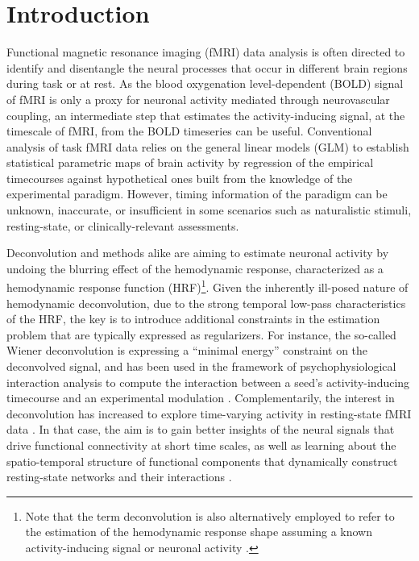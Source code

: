 
\section{Introduction}

Functional magnetic resonance imaging (fMRI) data analysis is often directed to
identify and disentangle the neural processes that occur in different brain
regions during task or at rest. As the blood oxygenation level-dependent (BOLD)
signal of fMRI is only a proxy for neuronal activity mediated through
neurovascular coupling, an intermediate step that estimates the
activity-inducing signal, at the timescale of fMRI, from the BOLD timeseries can
be useful. Conventional analysis of task fMRI data relies on the general linear
models (GLM) to establish statistical parametric maps of brain activity by
regression of the empirical timecourses against hypothetical ones built from the
knowledge of the experimental paradigm. However, timing information of the
paradigm can be unknown, inaccurate, or insufficient in some scenarios such as
naturalistic stimuli, resting-state, or clinically-relevant assessments.

Deconvolution and methods alike are aiming to estimate neuronal activity by
undoing the blurring effect of the hemodynamic response, characterized as a
hemodynamic response function (HRF)\footnote{Note that the term
deconvolution is also alternatively employed to refer to the estimation of the
hemodynamic response shape assuming a known activity-inducing signal or neuronal
activity
\citep{Goutte2000Modelinghaemodynamicresponse,Marrelec2002Bayesianestimationhemodynamic,
Ciuciu2003Unsupervisedrobustnonparametric,Casanova2008impacttemporalregularization}.
}. Given the inherently ill-posed nature of
hemodynamic deconvolution, due to the strong temporal low-pass characteristics
of the HRF, the key is to introduce additional constraints in the estimation
problem that are typically expressed as regularizers. For instance, the
so-called Wiener deconvolution is expressing a ``minimal energy'' constraint on
the deconvolved signal, and has been used in the framework of
psychophysiological interaction analysis to compute the interaction between a
seed's activity-inducing timecourse and an experimental modulation
\citep{Glover1999DeconvolutionImpulseResponse,Gitelman2003Modelingregionalpsychophysiologic,
Gerchen2014Analyzingtaskdependent,Di2018TaskConnectomicsExamining,
Freitas2020Timeresolvedeffective}.
Complementarily, the interest in deconvolution has increased to explore
time-varying activity in resting-state fMRI data
\citep{Preti2017dynamicfunctionalconnectome,Keilholz2017TimeResolvedResting,
Lurie2020Questionscontroversiesstudy,Bolton2020TappingMultiFaceted}.
In that case, the aim is to gain better insights of the neural signals that
drive functional connectivity at short time scales, as well as learning about
the spatio-temporal structure of functional components that dynamically
construct resting-state networks and their interactions
\citep{Karahanoglu2017Dynamicslargescale}.

